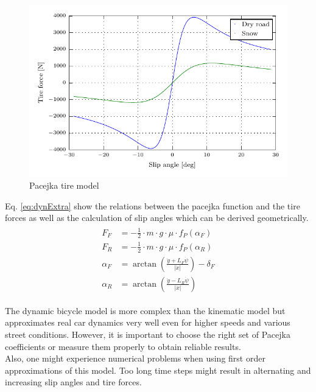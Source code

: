 \begin{figure}[ht]
	\centering
  	\includegraphics{../../Figures/Models/Pacejka.pdf}
	\caption{Pacejka tire model}
	\label{fig:Pacejka}
\end{figure}
Eq. \ref{eq:dynExtra} show the relations between the pacejka function and the tire forces as well as the calculation of slip angles which can be derived geometrically.
\begin{align}
\begin{split}\label{eq:dynExtra}
    F_F &= -\frac{1}{2}\cdot m\cdot g\cdot \mu \cdot f_P(\alpha_F)\\
    F_R &= -\frac{1}{2}\cdot m\cdot g\cdot \mu \cdot f_P(\alpha_R)\\
    \alpha_F &= \arctan\left(\frac{\dot y+L_F\dot\psi}{\lvert\dot x\lvert}\right) - \delta_F\\
    \alpha_R &= \arctan\left(\frac{\dot y-L_R\dot\psi}{\lvert\dot x\rvert}\right)
\end{split}
\end{align}

The dynamic bicycle model is more complex than the kinematic model but approximates real car dynamics very well even for higher speeds and various street conditions. However, it is important to choose the right set of Pacejka coefficients or measure them properly to obtain reliable results.\\
Also, one might experience numerical problems when using first order approximations of this model. Too long time steps might result in alternating and increasing slip angles and tire forces.

